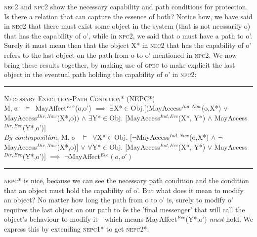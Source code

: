 \documentclass[a4paper,11pt, twoside,twocolumn]{article}
\newenvironment{logic}[1][]
{\begin{flushleft} \small }
{\end{flushleft}}
\newcommand{\loin}{$\in$}
\newcommand{\loforall}{$\forall$}
\newcommand{\loexists}{$\exists$}
\newcommand{\loand}{$\land$}
\newcommand{\loor} {$\lor$}
\newcommand{\loimplies}{$\implies$}
\newcommand{\losigma}{$\upsigma$}
\newcommand{\loturns} {$\vDash$}
\newcommand{\loneg}{$\boldsymbol \neg$}
\newcommand{\ablock} {\null\qquad}
\begin{document}
\textsc{nec2} and \textsc{npc2} show the necessary capability and path conditions for protection. Is there a relation that can capture the essence of both? Notice how, we have said in \textsc{nec2} that there must exist some object in the system (that is not necssarily o) that has the capability of o', while in \textsc{npc2}, we said that o must have a path to o'. Surely it must mean then that the object X* in \textsc{nec2} that has the capability of o' refers to the last object on the path from o to o' mentioned in \textsc{npc2}. We now bring these results together, by making use of \textsc{gpec} to make explicit the last object in the eventual path holding the capability of o' in \textsc{npc2}:\\
\begin{logic}
\hrule\null
\textsc{\normalsize *Necessary Execution-Path Condition* (NEPC*)}\\
M,\losigma\ \loturns\ MayAffect$^{Eve}$(o,o')\linebreak
\ablock \loimplies\linebreak
\ablock \loexists X*\loin Obj.$[($MayAccess$^{Ind,Now}$(o,X*) \loor \linebreak
\ablock \ablock \ablock \ablock MayAccess$^{Dir,Now}$(X*,o)$)$\linebreak
\ablock \ablock \ablock \ablock \loand \linebreak
\ablock \loexists Y*\loin{Obj}. $[$MayAccess$^{Ind,Eve}$(X*, Y*) \loand\linebreak
\ablock \ablock \ablock \ablock MayAccess$^{Dir,Eve}$(Y*,o')$]$
\linebreak \\
\textit{By contraposition,}\linebreak
M,\losigma\ \loturns\ 
\loforall X*\loin Obj. $[$\loneg MayAccess$^{Ind,Now}$(o,X*) \loand \linebreak
\ablock \ablock \ablock \ablock \loneg MayAccess$^{Dir,Now}$(X*,o)$]$\linebreak
\ablock \ablock \ablock \ablock \loor \linebreak
\ablock \quad\loforall Y*\loin{Obj}. $[$MayAccess$^{Ind,Eve}$(X*, Y*) \loor\linebreak
\ablock \ablock \ablock \ablock MayAccess$^{Dir,Eve}$(Y*,o')$]$
\ablock \loimplies \linebreak
	\ablock\loneg MayAffect$^{Eve}(o,o')$\linebreak
\hrule
\end{logic}
\textsc{nepc*} is nice, because we can see the necessary path condition and the condition that an object must hold the capability of o'. But what does it mean to modify an object? No matter how long the path from o to o' is, surely to modify o' requires the last object on our path to \textit{be} the 'final messenger' that will call the object's behaviour to modify it---which means MayAffect$^{Eve}$(Y*,o') \textit{must} hold. We express this by extending \textsc{nepc1*} to get \textsc{nepc2*}:\linebreak\\
\end{document}

